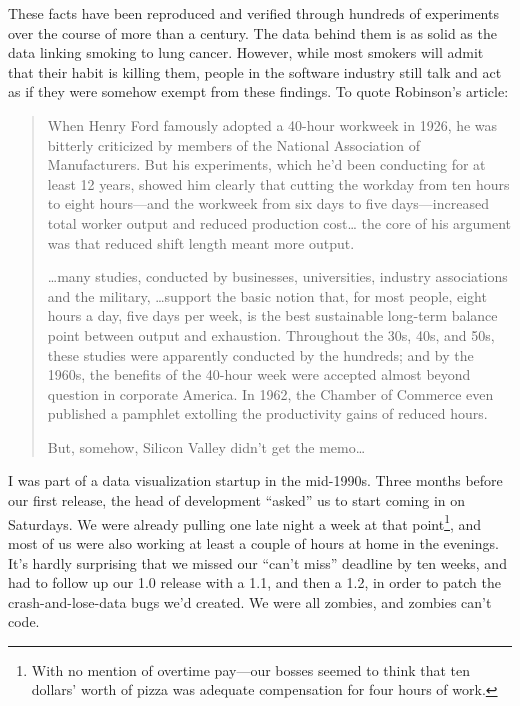 \documentclass{report}
\begin{document}
These facts have been reproduced and verified through hundreds of
experiments over the course of more than a century.  The data behind
them is as solid as the data linking smoking to lung cancer.  However,
while most smokers will admit that their habit is killing them, people
in the software industry still talk and act as if they were somehow
exempt from these findings.  To quote Robinson's article:

\begin{quotation}

  When Henry Ford famously adopted a 40-hour workweek in 1926, he was
  bitterly criticized by members of the National Association of
  Manufacturers. But his experiments, which he'd been conducting for
  at least 12 years, showed him clearly that cutting the workday from
  ten hours to eight hours---and the workweek from six days to five
  days---increased total worker output and reduced production
  cost{\ldots} the core of his argument was that reduced shift length
  meant more output.

  {\ldots}many studies, conducted by businesses, universities,
  industry associations and the military, {\ldots}support the basic
  notion that, for most people, eight hours a day, five days per week,
  is the best sustainable long-term balance point between output and
  exhaustion. Throughout the 30s, 40s, and 50s, these studies were
  apparently conducted by the hundreds; and by the 1960s, the benefits
  of the 40-hour week were accepted almost beyond question in
  corporate America. In 1962, the Chamber of Commerce even published a
  pamphlet extolling the productivity gains of reduced hours.

  But, somehow, Silicon Valley didn't get the memo{\ldots}

\end{quotation}

I was part of a data visualization startup in the mid-1990s.  Three
months before our first release, the head of development ``asked'' us
to start coming in on Saturdays.  We were already pulling one late
night a week at that point\footnote{With no mention of overtime
pay---our bosses seemed to think that ten dollars' worth of pizza was
adequate compensation for four hours of work.}, and most of us were
also working at least a couple of hours at home in the evenings.  It's
hardly surprising that we missed our ``can't miss'' deadline by ten
weeks, and had to follow up our 1.0 release with a 1.1, and then a
1.2, in order to patch the crash-and-lose-data bugs we'd created.  We
were all zombies, and zombies can't code.
\end{document}
